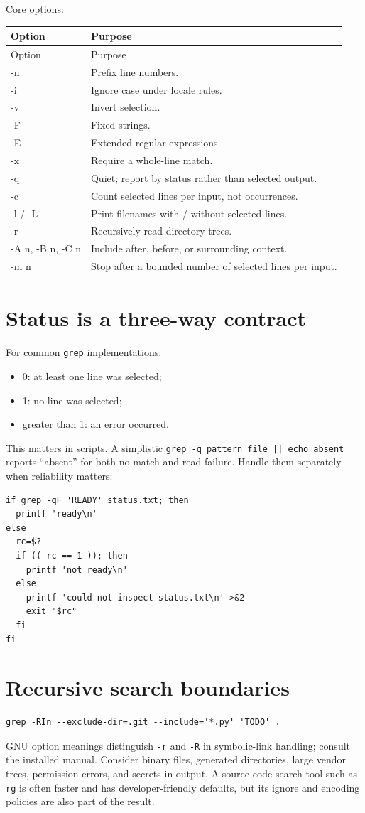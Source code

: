 \documentclass[11pt,oneside,openany]{book}
\begin{document}
Core options:
\begin{longtable}{>{\ttfamily}p{}p{}}
\toprule
Option & Purpose \\
\midrule
\endfirsthead\toprule Option & Purpose \\
\midrule\endhead
-n & Prefix line numbers. \\
-i & Ignore case under locale rules. \\
-v & Invert selection. \\
-F & Fixed strings. \\
-E & Extended regular expressions. \\
-x & Require a whole-line match. \\
-q & Quiet; report by status rather than selected output. \\
-c & Count selected lines per input, not occurrences. \\
-l / -L & Print filenames with / without selected lines. \\
-r & Recursively read directory trees. \\
-A n, -B n, -C n & Include after, before, or surrounding context. \\
-m n & Stop after a bounded number of selected lines per input. \\
\bottomrule
\end{longtable}

\section{Status is a three-way contract}
For common \texttt{grep} implementations:
\begin{itemize}
  \item 0: at least one line was selected;
  \item 1: no line was selected;
  \item greater than 1: an error occurred.
\end{itemize}
This matters in scripts. A simplistic \texttt{grep -q pattern file || echo absent} reports “absent” for both no-match and read failure. Handle them separately when reliability matters:
\begin{lstlisting}
if grep -qF 'READY' status.txt; then
  printf 'ready\n'
else
  rc=$?
  if (( rc == 1 )); then
    printf 'not ready\n'
  else
    printf 'could not inspect status.txt\n' >&2
    exit "$rc"
  fi
fi
\end{lstlisting}

\section{Recursive search boundaries}
\begin{lstlisting}
grep -RIn --exclude-dir=.git --include='*.py' 'TODO' .
\end{lstlisting}
GNU option meanings distinguish \texttt{-r} and \texttt{-R} in symbolic-link handling; consult the installed manual. Consider binary files, generated directories, large vendor trees, permission errors, and secrets in output. A source-code search tool such as \texttt{rg} is often faster and has developer-friendly defaults, but its ignore and encoding policies are also part of the result.
\end{document}
